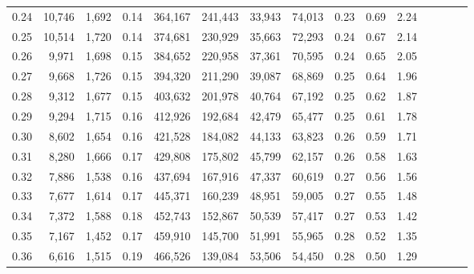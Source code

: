 \begin{tabular}{rrrcrrrrrrrrrrr}
0.24 &  10,746 &   1,692 &                                       0.14 &  364,167 &  241,443 &   33,943 &   74,013 &  0.23 &  0.69 &                         2.24 \\
0.25 &  10,514 &   1,720 &                                       0.14 &  374,681 &  230,929 &   35,663 &   72,293 &  0.24 &  0.67 &                         2.14 \\
0.26 &   9,971 &   1,698 &                                       0.15 &  384,652 &  220,958 &   37,361 &   70,595 &  0.24 &  0.65 &                         2.05 \\
0.27 &   9,668 &   1,726 &                                       0.15 &  394,320 &  211,290 &   39,087 &   68,869 &  0.25 &  0.64 &                         1.96 \\
0.28 &   9,312 &   1,677 &                                       0.15 &  403,632 &  201,978 &   40,764 &   67,192 &  0.25 &  0.62 &                         1.87 \\
0.29 &   9,294 &   1,715 &                                       0.16 &  412,926 &  192,684 &   42,479 &   65,477 &  0.25 &  0.61 &                         1.78 \\
0.30 &   8,602 &   1,654 &                                       0.16 &  421,528 &  184,082 &   44,133 &   63,823 &  0.26 &  0.59 &                         1.71 \\
0.31 &   8,280 &   1,666 &                                       0.17 &  429,808 &  175,802 &   45,799 &   62,157 &  0.26 &  0.58 &                         1.63 \\
0.32 &   7,886 &   1,538 &                                       0.16 &  437,694 &  167,916 &   47,337 &   60,619 &  0.27 &  0.56 &                         1.56 \\
0.33 &   7,677 &   1,614 &                                       0.17 &  445,371 &  160,239 &   48,951 &   59,005 &  0.27 &  0.55 &                         1.48 \\
0.34 &   7,372 &   1,588 &                                       0.18 &  452,743 &  152,867 &   50,539 &   57,417 &  0.27 &  0.53 &                         1.42 \\
0.35 &   7,167 &   1,452 &                                       0.17 &  459,910 &  145,700 &   51,991 &   55,965 &  0.28 &  0.52 &                         1.35 \\
0.36 &   6,616 &   1,515 &                                       0.19 &  466,526 &  139,084 &   53,506 &   54,450 &  0.28 &  0.50 &                         1.29 \\

\end{tabular}
